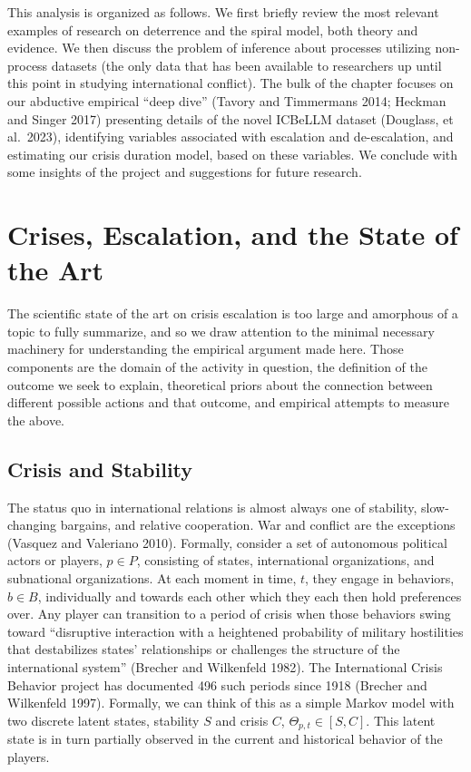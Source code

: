 \documentclass[
  letterpaper,
  DIV=11,
  numbers=noendperiod]{scrartcl}
\begin{document}
This analysis is organized as follows. We first briefly review the most
relevant examples of research on deterrence and the spiral model, both
theory and evidence. We then discuss the problem of inference about
processes utilizing non-process datasets (the only data that has been
available to researchers up until this point in studying international
conflict). The bulk of the chapter focuses on our abductive empirical
``deep dive'' (Tavory and Timmermans 2014; Heckman and Singer 2017)
presenting details of the novel ICBeLLM dataset (Douglass, et al.~2023),
identifying variables associated with escalation and de-escalation, and
estimating our crisis duration model, based on these variables. We
conclude with some insights of the project and suggestions for future
research.

\section{Crises, Escalation, and the State of the
Art}\label{crises-escalation-and-the-state-of-the-art}

The scientific state of the art on crisis escalation is too large and
amorphous of a topic to fully summarize, and so we draw attention to the
minimal necessary machinery for understanding the empirical argument
made here. Those components are the domain of the activity in question,
the definition of the outcome we seek to explain, theoretical priors
about the connection between different possible actions and that
outcome, and empirical attempts to measure the above.

\subsection{Crisis and Stability}\label{crisis-and-stability}

The status quo in international relations is almost always one of
stability, slow-changing bargains, and relative cooperation. War and
conflict are the exceptions (Vasquez and Valeriano 2010). Formally,
consider a set of autonomous political actors or players, \(p\in P\),
consisting of states, international organizations, and subnational
organizations. At each moment in time, \(t\), they engage in behaviors,
\(b\in B\), individually and towards each other which they each then
hold preferences over. Any player can transition to a period of crisis
when those behaviors swing toward ``disruptive interaction with a
heightened probability of military hostilities that destabilizes states'
relationships or challenges the structure of the international system''
(Brecher and Wilkenfeld 1982). The International Crisis Behavior project
has documented 496 such periods since 1918 (Brecher and Wilkenfeld
1997). Formally, we can think of this as a simple Markov model with two
discrete latent states, stability \(S\) and crisis \(C\),
\(\Theta_{p,t}\in[S,C]\). This latent state is in turn partially
observed in the current and historical behavior of the players.
\end{document}
